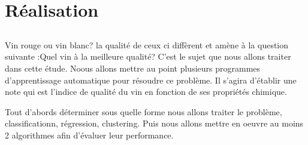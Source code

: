 \chapter{Réalisation}

\section{}
Vin rouge ou vin blanc? la qualité de ceux ci diffèrent et amène à la question suivante :Quel vin à la meilleure qualité?
C'est le sujet que nous allons traiter dans cette étude. Noous allons mettre au point plusieurs programmes d'apprentissage automatique
pour résoudre ce problème. Il s'agira d'établir une note qui est l'indice de qualité du vin en fonction de ses propriétés chimique.

Tout d'abords déterminer sous quelle forme nous allons traiter le problème, classificationn, régression, clustering.
Puis nous allons mettre en oeuvre au moins 2 algorithmes afin d'évaluer leur performance.
